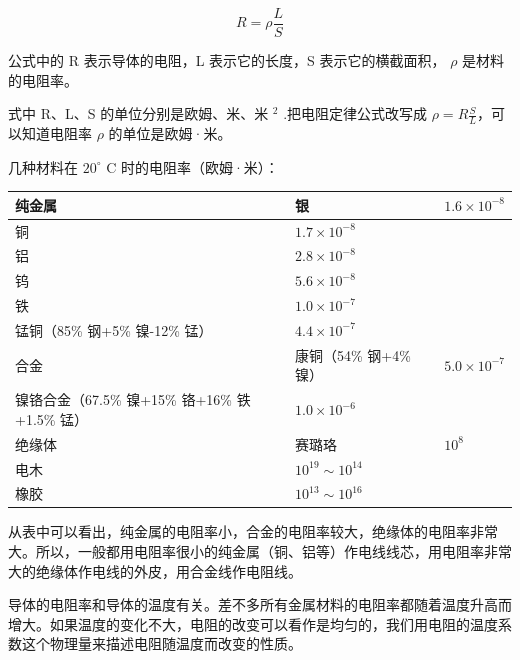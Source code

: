 \[
R = \rho \frac{L}{S}
\]

公式中的 R 表示导体的电阻，L 表示它的长度，S 表示它的横截面积， \(\rho\)
是材料的电阻率。

式中 R、L、S 的单位分别是欧姆、米、米 \(^{2}\) .把电阻定律公式改写成
\(\rho = R\frac{S}{L}\)，可以知道电阻率 \(\rho\) 的单位是欧姆·米。

几种材料在 \(20^{\circ}\) C 时的电阻率（欧姆·米）：

{\def\LTcaptype{none} %
\begin{longtable}[]{@{}
  >{\raggedright\arraybackslash}p{}
  >{\raggedright\arraybackslash}p{}
  >{\raggedright\arraybackslash}p{}@{}}
\toprule\noalign{}
\begin{minipage}[b]{\linewidth}\raggedright
纯金属
\end{minipage} & \begin{minipage}[b]{\linewidth}\raggedright
银
\end{minipage} & \begin{minipage}[b]{\linewidth}\raggedright
\(1.6 \times 10^{-8}\)
\end{minipage} \\
\midrule\noalign{}
\endhead
\bottomrule\noalign{}
\endlastfoot
铜 & \(1.7 \times 10^{-8}\) & \\
铝 & \(2.8 \times 10^{-8}\) & \\
钨 & \(5.6 \times 10^{-8}\) & \\
铁 & \(1.0 \times 10^{-7}\) & \\
锰铜（85\% 钢+5\% 镍-12\% 锰） & \(4.4 \times 10^{-7}\) & \\
合金 & 康铜（54\% 钢+4\% 镍） & \(5.0 \times 10^{-7}\) \\
镍铬合金（67.5\% 镍+15\% 铬+16\% 铁+1.5\% 锰） & \(1.0 \times 10^{-6}\)
& \\
绝缘体 & 赛璐珞 & \(10^{8}\) \\
电木 & \(10^{19} \sim 10^{14}\) & \\
橡胶 & \(10^{13} \sim 10^{16}\) & \\
\end{longtable}
}

从表中可以看出，纯金属的电阻率小，合金的电阻率较大，绝缘体的电阻率非常大。所以，一般都用电阻率很小的纯金属（铜、铝等）作电线线芯，用电阻率非常大的绝缘体作电线的外皮，用合金线作电阻线。

导体的电阻率和导体的温度有关。差不多所有金属材料的电阻率都随着温度升高而增大。如果温度的变化不大，电阻的改变可以看作是均匀的，我们用电阻的温度系数这个物理量来描述电阻随温度而改变的性质。

